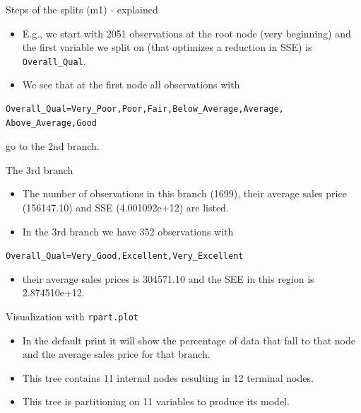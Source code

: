 \documentclass[
  10pt,
  ignorenonframetext,
]{beamer}
\providecommand{\tightlist}{%
  \setlength{\itemsep}{0pt}\setlength{\parskip}{0pt}}
\begin{document}
\begin{frame}[fragile]{Steps of the splits (m1) - explained}
\protect\hypertarget{steps-of-the-splits-m1---explained}{}

\begin{itemize}
\tightlist
\item
  E.g., we start with 2051 observations at the root node (very
  beginning) and the first variable we split on (that optimizes a
  reduction in SSE) is \texttt{Overall\_Qual}.
\item
  We see that at the first node all observations with
\end{itemize}

\begin{verbatim}
Overall_Qual=Very_Poor,Poor,Fair,Below_Average,Average,
Above_Average,Good
\end{verbatim}

go to the 2nd branch.

\end{frame}

\begin{frame}[fragile]{The 3rd branch}
\protect\hypertarget{the-3rd-branch}{}

\begin{itemize}
\tightlist
\item
  The number of observations in this branch (1699), their average sales
  price (156147.10) and SSE (4.001092e+12) are listed.
\item
  In the 3rd branch we have 352 observations with
\end{itemize}

\texttt{Overall\_Qual=Very\_Good,Excellent,Very\_Excellent}

\begin{itemize}
\tightlist
\item
  their average sales prices is 304571.10 and the SEE in this region is
  2.874510e+12. 
\end{itemize}

\begin{block}{Visualization with \texttt{rpart.plot}}

\begin{itemize}
\tightlist
\item
  In the default print it will show the percentage of data that fall to
  that node and the average sales price for that branch.
\item
  This tree contains 11 internal nodes resulting in 12 terminal nodes.
\item
  This tree is partitioning on 11 variables to produce its model. 
\end{itemize}

\end{block}

\end{frame}
\end{document}
